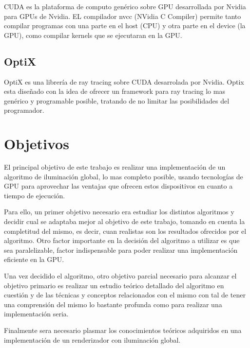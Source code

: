 CUDA es la plataforma de computo genérico sobre GPU desarrollada por Nvidia para GPUs de Nvidia. EL compilador nvcc (NVidia C Compiler) permite tanto compilar programas con una parte en el host (CPU) y otra parte en el device (la GPU), como compilar kernels que se ejecutaran en la GPU.

\subsection{OptiX}

OptiX es una librería de ray tracing sobre CUDA desarrolada por Nvidia. Optix esta diseñado con la idea de ofrecer un framework para ray tracing lo mas genérico y programable posible, tratando de no limitar las posibilidades del programador.

\clearpage

\section{Objetivos}

El principal objetivo de este trabajo es realizar una implementación de un algoritmo de iluminación global, lo mas completo posible, usando tecnologías de GPU para aprovechar las ventajas que ofrecen estos dispositivos en cuanto a tiempo de ejecución.

\medskip

Para ello, un primer objetivo necesario era estudiar los distintos algoritmos y decidir cual se adaptaba mejor al objetivo de este trabajo, tomando en cuenta la completitud del mismo, es decir, cuan realistas son los resultados ofrecidos por el algoritmo. Otro factor importante en la decisión del algoritmo a utilizar es que sea paralelizable, factor indispensable para poder realizar una implementación eficiente en la GPU.

\medskip

Una vez decidido el algoritmo, otro objetivo parcial necesario para alcanzar el objetivo primario es realizar un estudio teórico detallado del algoritmo en cuestión y de las técnicas y conceptos relacionados con el mismo con tal de tener una comprensión del mismo lo bastante profunda como para realizar una implementación seria.

\medskip

Finalmente sera necesario plasmar los conocimientos teóricos adquiridos en una implementación de un renderizador con iluminación global. 




